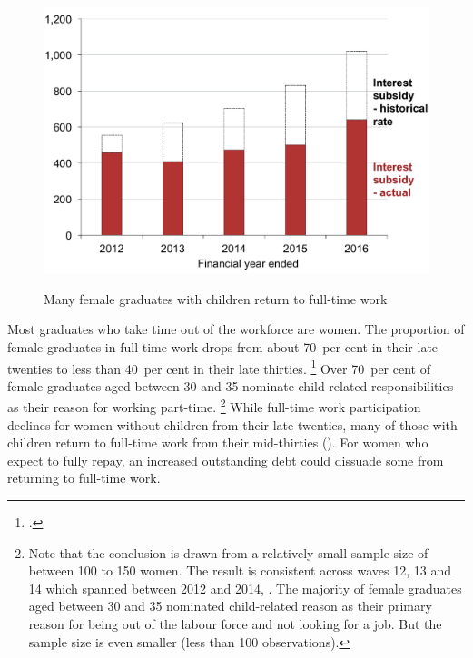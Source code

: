 \documentclass{grattan}
\begin{document}
\begin{figure}%
% 	
\caption{Many female graduates with children return to full-time work}\label{fig:fig16-many-female-grads-with-children-return-to-full-time-work}


\includegraphics[page=16]{atlas/Chartpack.pdf}

{\textcite{ABS2012Censuspopulationhousing}}
\end{figure}

Most graduates who take time out of the workforce are women.
The proportion of female graduates in full-time work drops from about 70~per cent in their late twenties to less than 40~per cent in their late thirties.%
\footcite[][Figure~9]{Norton2016HELPfuturefairer} %
Over 70~per cent of female graduates aged between 30 and 35 nominate child-related responsibilities as their reason for working part-time.%
   \footnote{Note that the conclusion is drawn from a relatively small sample size of between 100 to 150 women.
The result is consistent across waves 12, 13 and 14 which spanned between 2012 and 2014, \textcite{HILDA2015HouseholdIncomeLabour}.
The majority of female graduates aged between 30 and 35 nominated child-related reason as their primary reason for being out of the labour force and not looking for a job.
But the sample size is even smaller (less than 100 observations).} 
While full-time work participation declines for women without children from their late-twenties, many of those with children return to full-time work from their mid-thirties ().
For women who expect to fully repay, an increased outstanding debt could dissuade some from returning to full-time work.
\end{document}
